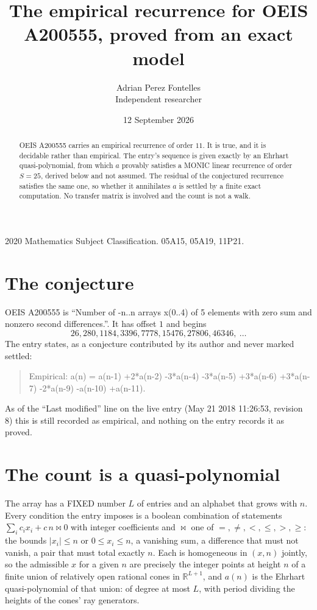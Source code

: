 \documentclass[11pt,a4paper]{article}
\title{The empirical recurrence for OEIS A200555, proved from an exact model}
\author{Adrian Perez Fontelles\\ \small Independent researcher}
\date{12 September 2026}
\theoremstyle{plain}
\theoremstyle{definition}
\begin{document}
\maketitle

\begin{abstract}
OEIS A200555 carries an empirical recurrence of order $11$. It is true, and it is
decidable rather than empirical. The entry's sequence is given exactly by an Ehrhart quasi-polynomial, from
which $a$ provably satisfies a MONIC linear recurrence of order $S=25$, derived below and not
assumed. The residual of the conjectured recurrence satisfies the same one, so whether it
annihilates $a$ is settled by a finite exact computation. No transfer matrix is involved and
the count is not a walk.
\end{abstract}

\noindent\small 2020 Mathematics Subject Classification. 05A15, 05A19, 11P21.\normalsize

\section{The conjecture}

OEIS A200555 is ``Number of -n..n arrays x(0..4) of 5 elements with zero sum and nonzero second differences.''. It has offset $1$ and begins
\[
26, 280, 1184, 3396, 7778, 15476, 27806, 46346,\ \dots
\]
The entry states, as a conjecture contributed by its author and never marked settled:
\begin{quote}
Empirical: a(n) = a(n-1) +2*a(n-2) -3*a(n-4) -3*a(n-5) +3*a(n-6) +3*a(n-7) -2*a(n-9) -a(n-10) +a(n-11).
\end{quote}
As of the ``Last modified'' line on the live entry (May 21 2018 11:26:53, revision 8)
this is still recorded as empirical, and nothing on the entry records it as proved.

\section{The count is a quasi-polynomial}

The array has a FIXED number $L$ of entries and an alphabet that grows with $n$. Every
condition the entry imposes is a boolean combination of statements
$\sum_i c_ix_i + c\,n \bowtie 0$ with integer coefficients and $\bowtie$ one of
$=,\ne,<,\le,>,\ge$: the bounds $|x_i|\le n$ or $0\le x_i\le n$, a vanishing sum, a difference
that must not vanish, a pair that must total exactly $n$. Each is homogeneous in $(x,n)$
jointly, so the admissible $x$ for a given $n$ are precisely the integer points at height $n$
of a finite union of relatively open rational cones in $\mathbb{R}^{L+1}$, and $a(n)$ is
the Ehrhart quasi-polynomial of that union: of degree at most $L$, with period dividing the
heights of the cones' ray generators.
\end{document}

